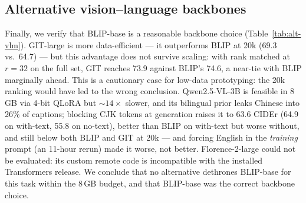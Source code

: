 \subsection{Alternative vision--language backbones}
\label{sec:res-backbones}

Finally, we verify that BLIP-base is a reasonable backbone choice
(Table~\ref{tab:alt-vlm}). GIT-large is more data-efficient --- it outperforms
BLIP at 20k (69.3 vs.\ 64.7) --- but this advantage does not survive scaling:
with rank matched at $r{=}32$ on the full set, GIT reaches 73.9 against BLIP's
74.6, a near-tie with BLIP marginally ahead. This is a cautionary case for
low-data prototyping: the 20k ranking would have led to the wrong conclusion.
Qwen2.5-VL-3B is feasible in 8\,GB via 4-bit QLoRA but $\sim\!14\times$ slower,
and its bilingual prior leaks Chinese into 26\% of captions; blocking CJK tokens
at generation raises it to 63.6 CIDEr (64.9 on with-text, 55.8 on no-text),
better than BLIP on with-text but worse without, and still below both BLIP and
GIT at 20k --- and forcing English in the \emph{training} prompt (an 11-hour
rerun) made it worse, not better. Florence-2-large could not be evaluated: its
custom remote code is incompatible with the installed Transformers release. We
conclude that no alternative dethrones BLIP-base for this task within the 8\,GB
budget, and that BLIP-base was the correct backbone choice.

